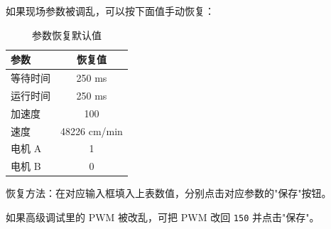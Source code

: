 如果现场参数被调乱，可以按下面值手动恢复：

\begin{table}[H]
    \centering
    \caption{参数恢复默认值}
    \label{tab:default-values}
    \begin{tabular}{lc}
        \toprule
        \textbf{参数} & \textbf{恢复值} \\
        \midrule
        等待时间 & 250 ms \\
        运行时间 & 250 ms \\
        加速度 & 100 \\
        速度 & 48226 cm/min \\
        电机 A & 1 \\
        电机 B & 0 \\
        \bottomrule
    \end{tabular}
\end{table}

恢复方法：在对应输入框填入上表数值，分别点击对应参数的"保存"按钮。

如果高级调试里的 PWM 被改乱，可把 PWM 改回 \texttt{150} 并点击"保存"。
